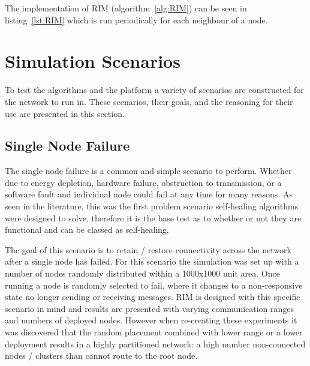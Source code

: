 \documentclass[authoryearcitations]{UoYCSproject}
\begin{document}
The implementation of RIM (algorithm~\ref{alg:RIM}) can be seen in listing~\ref{lst:RIM} which is run periodically for each neighbour of a node.


\section{Simulation Scenarios}
\label{sec:scenarios}

To test the algorithms and the platform a variety of scenarios are constructed for the network to run in. These scenarios, their goals, and the reasoning for their use are presented in this section.

\subsection{Single Node Failure}

The single node failure is a common and simple scenario to perform. Whether due to energy depletion, hardware failure, obstruction to transmission, or a software fault and individual node could fail at any time for many reasons. As seen in the literature, this was the first problem scenario self-healing algorithms were designed to solve, therefore it is the base test as to whether or not they are functional and can be classed as self-healing.

The goal of this scenario is to retain / restore connectivity across the network after a single node has failed. For this scenario the simulation was set up with a number of nodes randomly distributed within a 1000x1000 unit area. Once running a node is randomly selected to fail, where it changes to a non-responsive state no longer sending or receiving messages. RIM is designed with this specific scenario in mind and results are presented with varying communication ranges and numbers of deployed nodes. However when re-creating these experiments it was discovered that the random placement combined with lower range or a lower deployment results in a highly partitioned network: a high number non-connected nodes / clusters than cannot route to the root node.
\end{document}
